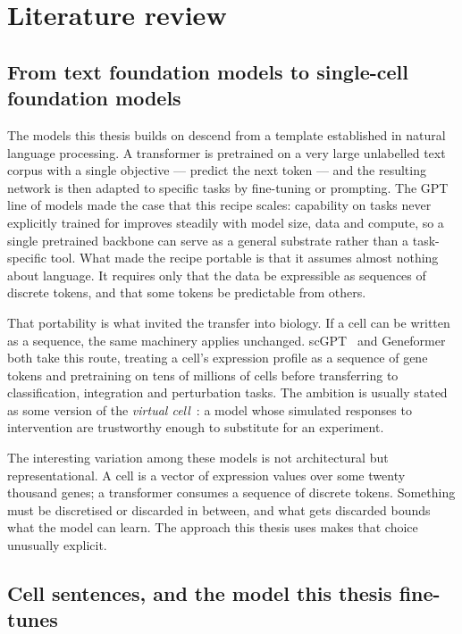 \section{Literature review}
\label{sec:litreview}

\subsection{From text foundation models to single-cell foundation models}

The models this thesis builds on descend from a template established in natural language
processing. A transformer is pretrained on a very large unlabelled text corpus with a single
objective --- predict the next token --- and the resulting network is then adapted to specific tasks
by fine-tuning or prompting. The GPT line of models made the case that this recipe scales: capability
on tasks never explicitly trained for improves steadily with model size, data and compute, so a
single pretrained backbone can serve as a general substrate rather than a task-specific tool. What
made the recipe portable is that it assumes almost nothing about language. It requires only that the
data be expressible as sequences of discrete tokens, and that some tokens be predictable from
others.

That portability is what invited the transfer into biology. If a cell can be written as a sequence,
the same machinery applies unchanged. scGPT~\cite{scgpt} and Geneformer~\cite{geneformer} both take
this route, treating a cell's expression profile as a sequence of gene tokens and pretraining on
tens of millions of cells before transferring to classification, integration and perturbation tasks.
The ambition is usually stated as some version of the \emph{virtual cell}~\cite{bunne}: a model
whose simulated responses to intervention are trustworthy enough to substitute for an experiment.

The interesting variation among these models is not architectural but representational. A cell is a
vector of expression values over some twenty thousand genes; a transformer consumes a sequence of
discrete tokens. Something must be discretised or discarded in between, and what gets discarded
bounds what the model can learn. The approach this thesis uses makes that choice unusually explicit.

\subsection{Cell sentences, and the model this thesis fine-tunes}
\label{sec:lit-c2s}

